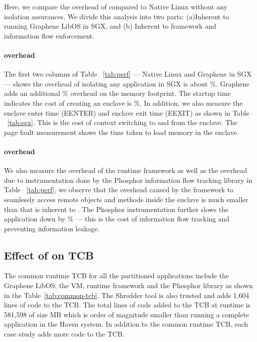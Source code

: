 Here, we compare the overhead of \sysname{} compared to Native Linux without any 
isolation assurances. We divide this analysis into two parts: (a)Inherent to running Graphene LibOS in SGX, and (b) Inherent to \sysname{} framework and information flow enforcement.

\paragraph{\sgx{} overhead}
The first two columns of Table ~\ref{tab:perf} --- Native Linux and Graphene in SGX --- shows the overhead of isolating any application in SGX is about \%. Graphene adds an additional \% overhead on the memory footprint. The startup time indicates the cost of creating an enclave is \%. 
In addition, we also measure the \sgx{} enclave enter time (EENTER) and enclave exit time (EEXIT) as shown in Table ~\ref{tab:sgx}. This is the cost of context switching to and from the enclave. The page fault measurement shows the time taken to load memory in the enclave.

\paragraph{\sysname{} overhead}
We also measure the overhead of the \sysname{} runtime framework as well as the 
overhead due to instrumentation done by the Phosphor information flow tracking library in Table ~\ref{tab:perf}, we observe that the overhead caused by the \sysname{} framework to seamlessly access remote objects and methods inside the enclave is much smaller than that is inherent to \sgx{}. The Phosphor instrumentation further slows the application down by \% --- this is the cost of information flow tracking and preventing information leakage. 
\subsection{Effect of \sysname{} on TCB}

The common runtime TCB for all the partitioned applications include the Graphene LibOS, 
the \java{} VM, \sysname{} runtime framework and the Phosphor library as shown in the 
Table~\ref{tab:common-tcb}. The \sysname{} Shredder tool is also trusted and 
adds 1,604 lines of code to the TCB. The total lines of code added to the TCB at runtime is 581,598 of size MB which is order of magnitude smaller than running a complete \java{} application in the Haven system.
In addition to the common runtime TCB, each case study adds more code to the TCB.

